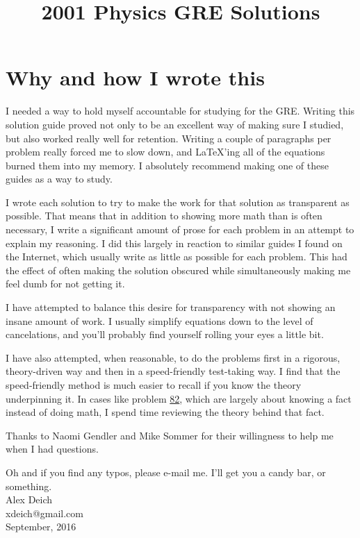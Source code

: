 \documentclass[11pt]{paper}
\title{2001 Physics GRE Solutions}
\begin{document}
\maketitle
\newpage
\section*{Why and how I wrote this}
I needed a way to hold myself accountable for studying for the GRE.  Writing this solution guide proved not only to be an excellent way of making sure I studied, but also worked really well for retention.  Writing a couple of paragraphs per problem really forced me to slow down, and \LaTeX'ing all of the equations burned them into my memory.  I absolutely recommend making one of these guides as a way to study.

I wrote each solution to try to make the work for that solution as transparent as possible.  That means that in addition to showing more math than is often necessary, I write a significant amount of prose for each problem in an attempt to explain my reasoning.  I did this largely in reaction to similar guides I found on the Internet, which usually write as little as possible for each problem.  This had the effect of often making the solution obscured while simultaneously making me feel dumb for not getting it.

I have attempted to balance this desire for transparency with not showing an insane amount of work.  I usually simplify equations down to the level of cancelations, and you'll probably find yourself rolling your eyes a little bit.

I have also attempted, when reasonable, to do the problems first in a rigorous, theory-driven way and then in a speed-friendly test-taking way.  I find that the speed-friendly method is much easier to recall if you know the theory underpinning it.  In cases like problem \hyperlink{section.82}{82}, which are largely about knowing a fact instead of doing math, I spend time reviewing the theory behind that fact.

Thanks to Naomi Gendler and Mike Sommer for their willingness to help me when I had questions.

Oh and if you find any typos, please e-mail me.  I'll get you a candy bar, or something.\\

Alex Deich\\
\phantom{.}\hspace{10pt} xdeich@gmail.com\\
\phantom{.}\hspace{10pt} September, 2016
\newpage
\tableofcontents
\newpage
\end{document}
